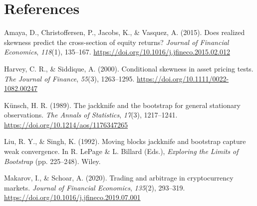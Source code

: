 \documentclass[12pt, a4paper]{article}
\theoremstyle{plain}
\theoremstyle{definition}
\begin{document}
\section*{References}
\begingroup
\setlength{\parindent}{-2em}
\setlength{\leftskip}{2em}
\setlength{\parskip}{6pt}
\small

Amaya, D., Christoffersen, P., Jacobs, K., \& Vasquez, A. (2015). Does realized skewness predict the cross-section of equity returns? \textit{Journal of Financial Economics}, \textit{118}(1), 135--167. \url{https://doi.org/10.1016/j.jfineco.2015.02.012}

Harvey, C. R., \& Siddique, A. (2000). Conditional skewness in asset pricing tests. \textit{The Journal of Finance}, \textit{55}(3), 1263--1295. \url{https://doi.org/10.1111/0022-1082.00247}

Künsch, H. R. (1989). The jackknife and the bootstrap for general stationary observations. \textit{The Annals of Statistics}, \textit{17}(3), 1217--1241. \url{https://doi.org/10.1214/aos/1176347265}

Liu, R. Y., \& Singh, K. (1992). Moving blocks jackknife and bootstrap capture weak convergence. In R. LePage \& L. Billard (Eds.), \textit{Exploring the Limits of Bootstrap} (pp. 225--248). Wiley.

Makarov, I., \& Schoar, A. (2020). Trading and arbitrage in cryptocurrency markets. \textit{Journal of Financial Economics}, \textit{135}(2), 293--319. \url{https://doi.org/10.1016/j.jfineco.2019.07.001}

\endgroup
\end{document}
